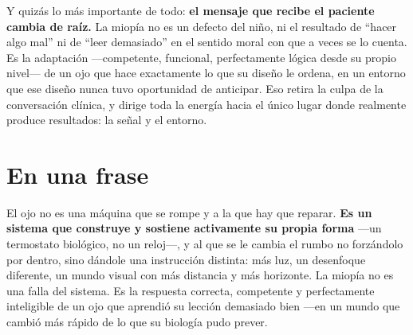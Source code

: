 \documentclass[10pt,a4paper]{article}
\providecommand{\enquote}[1]{``#1''}
\begin{document}
Y quiz\'as lo m\'as importante de todo: \textbf{el mensaje que recibe el paciente cambia de ra\'iz.} La miop\'ia no es un defecto del ni\~no, ni el resultado de \enquote{hacer algo mal} ni de \enquote{leer demasiado} en el sentido moral con que a veces se lo cuenta. Es la adaptaci\'on ---competente, funcional, perfectamente l\'ogica desde su propio nivel--- de un ojo que hace exactamente lo que su dise\~no le ordena, en un entorno que ese dise\~no nunca tuvo oportunidad de anticipar. Eso retira la culpa de la conversaci\'on cl\'inica, y dirige toda la energ\'ia hacia el \'unico lugar donde realmente produce resultados: la se\~nal y el entorno.

\section*{En una frase}

El ojo no es una m\'aquina que se rompe y a la que hay que reparar. \textbf{Es un sistema que construye y sostiene activamente su propia forma} ---un termostato biol\'ogico, no un reloj---, y al que se le cambia el rumbo no forz\'andolo por dentro, sino d\'andole una instrucci\'on distinta: m\'as luz, un desenfoque diferente, un mundo visual con m\'as distancia y m\'as horizonte. La miop\'ia no es una falla del sistema. Es la respuesta correcta, competente y perfectamente inteligible de un ojo que aprendi\'o su lecci\'on demasiado bien ---en un mundo que cambi\'o m\'as r\'apido de lo que su biolog\'ia pudo prever.
\end{document}

